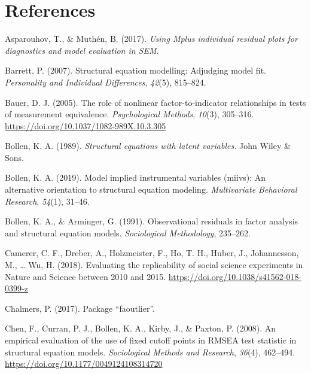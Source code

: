 \documentclass[
  english,
  doc]{apa6}
\newlength{\cslhangindent}
\newenvironment{cslreferences}%
  {\setlength{\parindent}{0pt}%
  \everypar{\setlength{\hangindent}{\cslhangindent}}\ignorespaces}%
  {\par}
\begin{document}
\hypertarget{references}{%
\section*{References}\label{references}}

\hypertarget{refs}{}
\begin{cslreferences}
\leavevmode\hypertarget{ref-Asparouhov2017}{}%
Asparouhov, T., \& Muthén, B. (2017). \emph{Using Mplus individual residual plots for diagnostics and model evaluation in SEM}.

\leavevmode\hypertarget{ref-barrett2007structural}{}%
Barrett, P. (2007). Structural equation modelling: Adjudging model fit. \emph{Personality and Individual Differences}, \emph{42}(5), 815--824.

\leavevmode\hypertarget{ref-Bauer2005}{}%
Bauer, D. J. (2005). The role of nonlinear factor-to-indicator relationships in tests of measurement equivalence. \emph{Psychological Methods}, \emph{10}(3), 305--316. \url{https://doi.org/10.1037/1082-989X.10.3.305}

\leavevmode\hypertarget{ref-bollen_structural_1989}{}%
Bollen, K. A. (1989). \emph{Structural equations with latent variables.} John Wiley \& Sons.

\leavevmode\hypertarget{ref-bollen2019model}{}%
Bollen, K. A. (2019). Model implied instrumental variables (miivs): An alternative orientation to structural equation modeling. \emph{Multivariate Behavioral Research}, \emph{54}(1), 31--46.

\leavevmode\hypertarget{ref-bollen1991observational}{}%
Bollen, K. A., \& Arminger, G. (1991). Observational residuals in factor analysis and structural equation models. \emph{Sociological Methodology}, 235--262.

\leavevmode\hypertarget{ref-Camerer2018}{}%
Camerer, C. F., Dreber, A., Holzmeister, F., Ho, T. H., Huber, J., Johannesson, M., \ldots{} Wu, H. (2018). Evaluating the replicability of social science experiments in Nature and Science between 2010 and 2015. \url{https://doi.org/10.1038/s41562-018-0399-z}

\leavevmode\hypertarget{ref-chalmers2017package}{}%
Chalmers, P. (2017). Package ``faoutlier''.

\leavevmode\hypertarget{ref-Chen2008}{}%
Chen, F., Curran, P. J., Bollen, K. A., Kirby, J., \& Paxton, P. (2008). An empirical evaluation of the use of fixed cutoff points in RMSEA test statistic in structural equation models. \emph{Sociological Methods and Research}, \emph{36}(4), 462--494. \url{https://doi.org/10.1177/0049124108314720}


\end{cslreferences}
\end{document}
